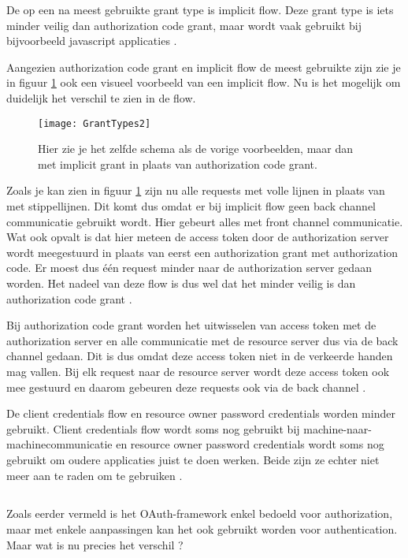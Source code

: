 De op een na meest gebruikte grant type is implicit flow. Deze grant type is iets minder veilig dan authorization code grant, maar wordt vaak gebruikt bij bijvoorbeeld javascript applicaties \autocite{OktaDev2018}. 

Aangezien authorization code grant en implicit flow de meest gebruikte zijn zie je in figuur \ref{fig:grantTypes2} ook een visueel voorbeeld van een implicit flow. Nu is het mogelijk om duidelijk het verschil te zien in de flow.
\begin{figure}[H]
	\centering
	\texttt{[image: GrantTypes2]} 
	\caption[Visuele voorstelling van implicit grant]{Hier zie je het zelfde schema als de vorige voorbeelden, maar dan met implicit grant in plaats van authorization code grant.}
	\label{fig:grantTypes2}
\end{figure}
Zoals je kan zien in figuur \ref{fig:grantTypes2} zijn nu alle requests met volle lijnen in plaats van met stippellijnen. Dit komt dus omdat er bij implicit flow geen back channel communicatie gebruikt wordt. Hier gebeurt alles met front channel communicatie. Wat ook opvalt is dat hier meteen de access token door de authorization server wordt meegestuurd in plaats van eerst een authorization grant met authorization code. Er moest dus één request minder naar de authorization server gedaan worden. Het nadeel van deze flow is dus wel dat het minder veilig is dan authorization code grant \autocite{OktaDev2018}. 

Bij authorization code grant worden het uitwisselen van access token met de authorization server en alle communicatie met de resource server dus via de back channel gedaan. Dit is dus omdat deze access token niet in de verkeerde handen mag vallen. Bij elk request naar de resource server wordt deze access token ook mee gestuurd en daarom gebeuren deze requests ook via de back channel \autocite{OktaDev2018}.

De client credentials flow en resource owner password credentials worden minder gebruikt. Client credentials flow wordt soms nog gebruikt bij machine-naar-machinecommunicatie en resource owner password credentials wordt soms nog gebruikt om oudere applicaties juist te doen werken. Beide zijn ze echter niet meer aan te raden om te gebruiken \autocite{OktaDev2018}.

\subsection{}
Zoals eerder vermeld is het OAuth-framework enkel bedoeld voor authorization, maar met enkele aanpassingen kan het ook gebruikt worden voor authentication. Maar wat is nu precies het verschil \autocite{rwike772020}?

